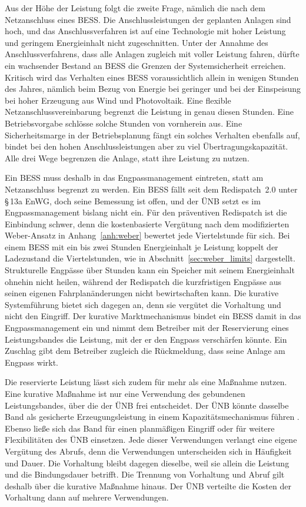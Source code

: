 Aus der Höhe der Leistung folgt die zweite Frage, nämlich die nach dem Netzanschluss eines \ac{BESS}.
Die Anschlussleistungen der geplanten Anlagen sind hoch, und das Anschlussverfahren ist auf eine Technologie mit hoher Leistung und geringem Energieinhalt nicht zugeschnitten.
Unter der Annahme des Anschlussverfahrens, dass alle Anlagen zugleich mit voller Leistung fahren, dürfte ein wachsender Bestand an \ac{BESS} die Grenzen der Systemsicherheit erreichen.
Kritisch wird das Verhalten eines \ac{BESS} voraussichtlich allein in wenigen Stunden des Jahres, nämlich beim Bezug von Energie bei geringer und bei der Einspeisung bei hoher Erzeugung aus Wind und Photovoltaik.
Eine flexible Netzanschlussvereinbarung begrenzt die Leistung in genau diesen Stunden.
Eine Betriebsvorgabe schlösse solche Stunden von vornherein aus.
Eine Sicherheitsmarge in der Betriebsplanung fängt ein solches Verhalten ebenfalls auf, bindet bei den hohen Anschlussleistungen aber zu viel Übertragungskapazität.
Alle drei Wege begrenzen die Anlage, statt ihre Leistung zu nutzen.

Ein \ac{BESS} muss deshalb in das Engpassmanagement eintreten, statt am Netzanschluss begrenzt zu werden.
Ein \ac{BESS} fällt seit dem Redispatch~2.0 unter §\,13a \ac{EnWG}, doch seine Bemessung ist offen, und der \ac{ÜNB} setzt es im Engpassmanagement bislang nicht ein.
Für den präventiven Redispatch ist die Einbindung schwer, denn die kostenbasierte Vergütung nach dem modifizierten Weber-Ansatz in Anhang~\ref{anh:weber} bewertet jede Viertelstunde für sich.
Bei einem \ac{BESS} mit ein bis zwei Stunden Energieinhalt je Leistung koppelt der Ladezustand die Viertelstunden, wie in Abschnitt~\ref{sec:weber_limits} dargestellt.
Strukturelle Engpässe über Stunden kann ein Speicher mit seinem Energieinhalt ohnehin nicht heilen, während der Redispatch die kurzfristigen Engpässe aus seinen eigenen Fahrplanänderungen nicht bewirtschaften kann.
Die kurative Systemführung bietet sich dagegen an, denn sie vergütet die Vorhaltung und nicht den Eingriff.
Der kurative Marktmechanismus bindet ein \ac{BESS} damit in das Engpassmanagement ein und nimmt dem Betreiber mit der Reservierung eines Leistungsbandes die Leistung, mit der er den Engpass verschärfen könnte.
Ein Zuschlag gibt dem Betreiber zugleich die Rückmeldung, dass seine Anlage am Engpass wirkt.

Die reservierte Leistung lässt sich zudem für mehr als eine Maßnahme nutzen.
Eine kurative Maßnahme ist nur eine Verwendung des gebundenen Leistungsbandes, über die der \ac{ÜNB} frei entscheidet.
Der \ac{ÜNB} könnte dasselbe Band als gesicherte Erzeugungsleistung in einem Kapazitätsmechanismus führen \cite{consentec_ausarbeitung_2024}.
Ebenso ließe sich das Band für einen planmäßigen Eingriff oder für weitere Flexibilitäten des \ac{ÜNB} einsetzen.
Jede dieser Verwendungen verlangt eine eigene Vergütung des Abrufs, denn die Verwendungen unterscheiden sich in Häufigkeit und Dauer.
Die Vorhaltung bleibt dagegen dieselbe, weil sie allein die Leistung und die Bindungsdauer betrifft.
Die Trennung von Vorhaltung und Abruf gilt deshalb über die kurative Maßnahme hinaus.
Der \ac{ÜNB} verteilte die Kosten der Vorhaltung dann auf mehrere Verwendungen.

